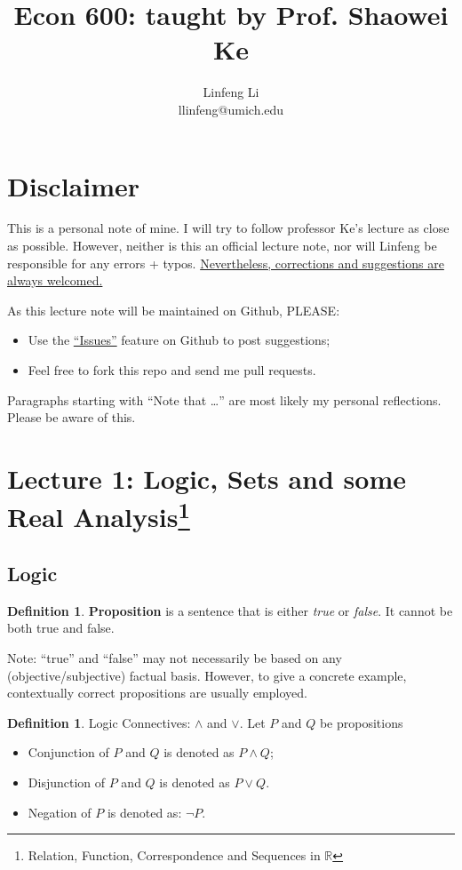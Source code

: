 \documentclass[12pt]{article}
\title{Econ 600: taught by Prof. Shaowei Ke}
\author{Linfeng Li \\ llinfeng@umich.edu}
\newcommand{\R}{{\mathbb R}}
\theoremstyle{definition}
\newtheorem{definition}[theorem]{Definition}
\theoremstyle{plain}
\begin{document}
\maketitle

\section*{Disclaimer}
This is a personal note of mine. I will try to follow professor Ke's lecture as 
close as possible. However, neither is this an official lecture note, nor will 
Linfeng be responsible for any errors + typos. 
\underline{Nevertheless, corrections and suggestions are always welcomed.}

\smallskip

As this lecture note will be maintained on Github, PLEASE: 
\begin{itemize}
    \item Use the \href{https://github.com/llinfeng/Econ_600/issues}{``Issues''} feature on Github to post suggestions;
    \item Feel free to fork this repo and send me pull requests.
\end{itemize}
Paragraphs starting with ``Note that \ldots'' are most likely my personal 
reflections. Please be aware of this.

\section{Lecture 1: Logic, Sets and some Real Analysis\footnote{Relation, 
Function, Correspondence and Sequences in $\R$}}

\subsection{Logic}
\begin{definition}
    \textbf{Proposition} is a sentence that is either \textit{true} or 
    \textit{false}. It cannot be both true and false.
\end{definition}
Note: ``true'' and ``false'' may not necessarily be based on any (objective/subjective) 
factual basis. However, to give a concrete example, contextually correct 
propositions are usually employed.

\begin{definition}
    Logic Connectives: $\land$ and $\lor$. Let $P$ and $Q$ be propositions 
    \begin{itemize}
        \item Conjunction of $P$ and $Q$ is denoted as $P \land Q$;
        \item Disjunction of $P$ and $Q$ is denoted as $P \lor  Q$.
        \item Negation of $P$ is denoted as: $\neg P$.
    \end{itemize}
\end{definition}
\end{document}
